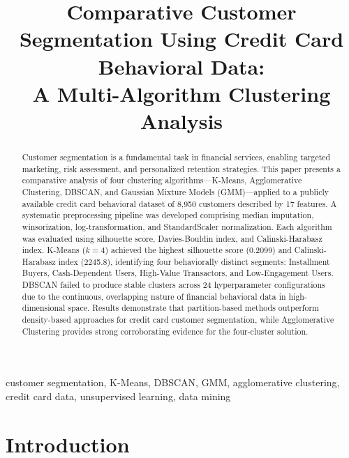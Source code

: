 \documentclass[conference]{IEEEtran}
\begin{document}
\title{Comparative Customer Segmentation Using Credit Card Behavioral Data:\\A Multi-Algorithm Clustering Analysis}

\author{
}

\maketitle

\begin{abstract}
Customer segmentation is a fundamental task in financial services,
enabling targeted marketing, risk assessment, and personalized
retention strategies. This paper presents a comparative analysis of
four clustering algorithms---K-Means, Agglomerative Clustering,
DBSCAN, and Gaussian Mixture Models (GMM)---applied to a publicly
available credit card behavioral dataset of 8,950 customers described
by 17 features. A systematic preprocessing pipeline was developed
comprising median imputation, winsorization, log-transformation, and
StandardScaler normalization. Each algorithm was evaluated using
silhouette score, Davies-Bouldin index, and Calinski-Harabasz index.
K-Means ($k{=}4$) achieved the highest silhouette score (0.2099) and
Calinski-Harabasz index (2245.8), identifying four behaviorally
distinct segments: Installment Buyers, Cash-Dependent Users,
High-Value Transactors, and Low-Engagement Users. DBSCAN failed to
produce stable clusters across 24 hyperparameter configurations due
to the continuous, overlapping nature of financial behavioral data in
high-dimensional space. Results demonstrate that partition-based
methods outperform density-based approaches for credit card customer
segmentation, while Agglomerative Clustering provides strong
corroborating evidence for the four-cluster solution.
\end{abstract}

\begin{IEEEkeywords}
customer segmentation, K-Means, DBSCAN, GMM, agglomerative
clustering, credit card data, unsupervised learning, data mining
\end{IEEEkeywords}

\section{Introduction}
\end{document}
